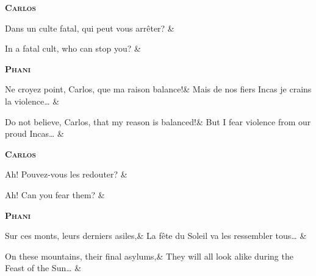 \documentclass{article}
\newcommand{\dialogue}[1]{%
\filbreak\begin{center}
	\textbf{\textsc{#1}}
\end{center}\nopagebreak}
\begin{document}

\dialogue{Carlos}
\begin{pairs}
\begin{Leftside}
	\stanza
		Dans un culte fatal, qui peut vous arr\^{e}ter?
    \& 
    \endnumbering
\end{Leftside}
\begin{Rightside}
	\stanza
		In a fatal cult, who can stop you?
    \& 
    \endnumbering
\end{Rightside} 
\Columns 
\end{pairs}

\dialogue{Phani}
\begin{pairs}
\begin{Leftside}
	\stanza
		Ne croyez point, Carlos, que ma raison balance!&
		Mais de nos fiers Incas je crains la violence\ldots{}
    \& 
    \endnumbering
\end{Leftside}
\begin{Rightside}
	\stanza
		Do not believe, Carlos, that my reason is balanced!&
		But I fear violence from our proud Incas\ldots{}
    \& 
    \endnumbering
\end{Rightside} 
\Columns 
\end{pairs}

\dialogue{Carlos}
\begin{pairs}
\begin{Leftside}
	\stanza
		Ah! Pouvez-vous les redouter?
    \& 
    \endnumbering
\end{Leftside}
\begin{Rightside}
	\stanza
		Ah! Can you fear them?
    \& 
    \endnumbering
\end{Rightside} 
\Columns 
\end{pairs}

\dialogue{Phani}
\begin{pairs}
\begin{Leftside}
	\stanza
		Sur ces monts, leurs derniers asiles,&
		La f\^{e}te du Soleil va les ressembler tous\ldots{}
    \& 
    \endnumbering
\end{Leftside}
\begin{Rightside}
	\stanza
		On these mountains, their final asylums,&
		They will all look alike during the Feast of the Sun\ldots{}
    \& 
    \endnumbering
\end{Rightside} 
\Columns 
\end{pairs}
 
\end{document}
